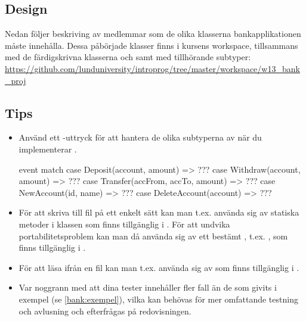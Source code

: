 \subsection{Design}
Nedan följer beskriving av medlemmar som de olika klasserna bankapplikationen måste innehålla. Dessa påbörjade klasser finns i kursens workspace, tillsammans med de färdigskrivna klasserna  och  samt  med tillhörande subtyper: \url{https://github.com/lunduniversity/introprog/tree/master/workspace/w13_bank_proj}





\subsection{Tips}

\begin{itemize}
\item Använd ett -uttryck för att hantera de olika subtyperna av  när du implementerar .
\begin{Code}
event match {
  case Deposit(account, amount) => ???
  case Withdraw(account, amount) => ???
  case Transfer(accFrom, accTo, amount) => ???
  case NewAccount(id, name) => ???
  case DeleteAccount(account) => ???
}
\end{Code}

\item För att skriva till fil på ett enkelt sätt kan man t.ex. använda sig av statiska metoder i klassen  som finns tillgänglig i . För att undvika portabilitetsproblem kan man då använda sig av ett bestämt , t.ex. , som finns tillgänglig i .

\item För att läsa ifrån en fil kan man t.ex. använda sig av  som finns tillgänglig i .

\item Var noggrann med att dina tester innehåller fler fall än de som givits i exempel (se \ref{bank:exempel}), vilka kan behövas för mer omfattande testning och avlusning och efterfrågas på redovisningen.
\end{itemize}

